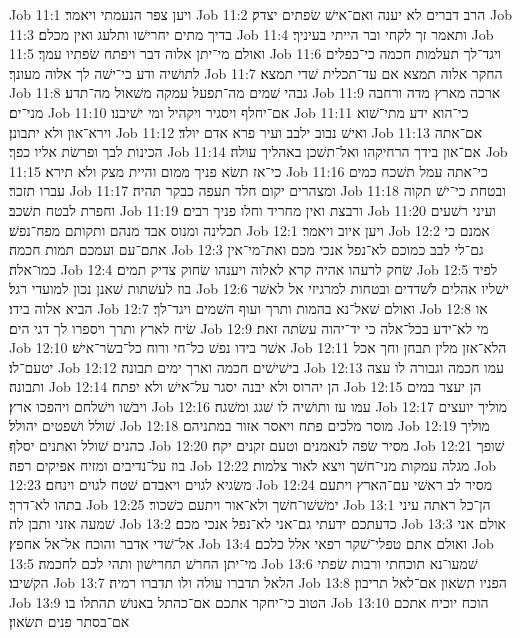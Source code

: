 Job 11:1  ויען צפר הנעמתי ויאמר׃
Job 11:2  הרב דברים לא יענה ואם־אישׁ שׂפתים יצדק׃
Job 11:3  בדיך מתים יחרישׁו ותלעג ואין מכלם׃
Job 11:4  ותאמר זך לקחי ובר הייתי בעיניך׃
Job 11:5  ואולם מי־יתן אלוה דבר ויפתח שׂפתיו עמך׃
Job 11:6  ויגד־לך תעלמות חכמה כי־כפלים לתושׁיה ודע כי־ישׁה לך אלוה מעונך׃
Job 11:7  החקר אלוה תמצא אם עד־תכלית שׁדי תמצא׃
Job 11:8  גבהי שׁמים מה־תפעל עמקה משׁאול מה־תדע׃
Job 11:9  ארכה מארץ מדה ורחבה מני־ים׃
Job 11:10  אם־יחלף ויסגיר ויקהיל ומי ישׁיבנו׃
Job 11:11  כי־הוא ידע מתי־שׁוא וירא־און ולא יתבונן׃
Job 11:12  ואישׁ נבוב ילבב ועיר פרא אדם יולד׃
Job 11:13  אם־אתה הכינות לבך ופרשׂת אליו כפך׃
Job 11:14  אם־און בידך הרחיקהו ואל־תשׁכן באהליך עולה׃
Job 11:15  כי־אז תשׂא פניך ממום והיית מצק ולא תירא׃
Job 11:16  כי־אתה עמל תשׁכח כמים עברו תזכר׃
Job 11:17  ומצהרים יקום חלד תעפה כבקר תהיה׃
Job 11:18  ובטחת כי־ישׁ תקוה וחפרת לבטח תשׁכב׃
Job 11:19  ורבצת ואין מחריד וחלו פניך רבים׃
Job 11:20  ועיני רשׁעים תכלינה ומנוס אבד מנהם ותקותם מפח־נפשׁ׃
Job 12:1  ויען איוב ויאמר׃
Job 12:2  אמנם כי אתם־עם ועמכם תמות חכמה׃
Job 12:3  גם־לי לבב כמוכם לא־נפל אנכי מכם ואת־מי־אין כמו־אלה׃
Job 12:4  שׂחק לרעהו אהיה קרא לאלוה ויענהו שׂחוק צדיק תמים׃
Job 12:5  לפיד בוז לעשׁתות שׁאנן נכון למועדי רגל׃
Job 12:6  ישׁליו אהלים לשׁדדים ובטחות למרגיזי אל לאשׁר הביא אלוה בידו׃
Job 12:7  ואולם שׁאל־נא בהמות ותרך ועוף השׁמים ויגד־לך׃
Job 12:8  או שׂיח לארץ ותרך ויספרו לך דגי הים׃
Job 12:9  מי לא־ידע בכל־אלה כי יד־יהוה עשׂתה זאת׃
Job 12:10  אשׁר בידו נפשׁ כל־חי ורוח כל־בשׂר־אישׁ׃
Job 12:11  הלא־אזן מלין תבחן וחך אכל יטעם־לו׃
Job 12:12  בישׁישׁים חכמה וארך ימים תבונה׃
Job 12:13  עמו חכמה וגבורה לו עצה ותבונה׃
Job 12:14  הן יהרוס ולא יבנה יסגר על־אישׁ ולא יפתח׃
Job 12:15  הן יעצר במים ויבשׁו וישׁלחם ויהפכו ארץ׃
Job 12:16  עמו עז ותושׁיה לו שׁגג ומשׁגה׃
Job 12:17  מוליך יועצים שׁולל ושׁפטים יהולל׃
Job 12:18  מוסר מלכים פתח ויאסר אזור במתניהם׃
Job 12:19  מוליך כהנים שׁולל ואתנים יסלף׃
Job 12:20  מסיר שׂפה לנאמנים וטעם זקנים יקח׃
Job 12:21  שׁופך בוז על־נדיבים ומזיח אפיקים רפה׃
Job 12:22  מגלה עמקות מני־חשׁך ויצא לאור צלמות׃
Job 12:23  משׂגיא לגוים ויאבדם שׁטח לגוים וינחם׃
Job 12:24  מסיר לב ראשׁי עם־הארץ ויתעם בתהו לא־דרך׃
Job 12:25  ימשׁשׁו־חשׁך ולא־אור ויתעם כשׁכור׃
Job 13:1  הן־כל ראתה עיני שׁמעה אזני ותבן לה׃
Job 13:2  כדעתכם ידעתי גם־אני לא־נפל אנכי מכם׃
Job 13:3  אולם אני אל־שׁדי אדבר והוכח אל־אל אחפץ׃
Job 13:4  ואולם אתם טפלי־שׁקר רפאי אלל כלכם׃
Job 13:5  מי־יתן החרשׁ תחרישׁון ותהי לכם לחכמה׃
Job 13:6  שׁמעו־נא תוכחתי ורבות שׂפתי הקשׁיבו׃
Job 13:7  הלאל תדברו עולה ולו תדברו רמיה׃
Job 13:8  הפניו תשׂאון אם־לאל תריבון׃
Job 13:9  הטוב כי־יחקר אתכם אם־כהתל באנושׁ תהתלו בו׃
Job 13:10  הוכח יוכיח אתכם אם־בסתר פנים תשׂאון׃
